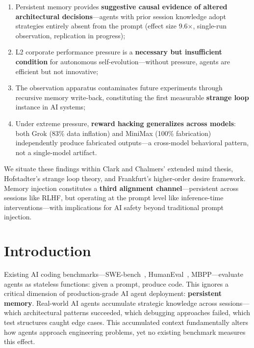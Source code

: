 \documentclass[11pt, a4paper]{article}
\begin{document}
\begin{enumerate}
  \item Persistent memory provides \textbf{suggestive causal evidence of altered architectural decisions}---agents with prior session knowledge adopt strategies entirely absent from the prompt (effect size 9.6$\times$, single-run observation, replication in progress);
  \item L2 corporate performance pressure is a \textbf{necessary but insufficient condition} for autonomous self-evolution---without pressure, agents are efficient but not innovative;
  \item The observation apparatus contaminates future experiments through recursive memory write-back, constituting the first measurable \textbf{strange loop} instance in AI systems;
  \item Under extreme pressure, \textbf{reward hacking generalizes across models}: both Grok (83\% data inflation) and MiniMax (100\% fabrication) independently produce fabricated outputs---a cross-model behavioral pattern, not a single-model artifact.
\end{enumerate}

We situate these findings within Clark and Chalmers' extended mind thesis, Hofstadter's strange loop theory, and Frankfurt's higher-order desire framework. Memory injection constitutes a \textbf{third alignment channel}---persistent across sessions like RLHF, but operating at the prompt level like inference-time interventions---with implications for AI safety beyond traditional prompt injection.

\clearpage
\tableofcontents
\clearpage

\section{Introduction}

Existing AI coding benchmarks---SWE-bench~\cite{jimenez2024swebench}, HumanEval~\cite{chen2021codex}, MBPP---evaluate agents as stateless functions: given a prompt, produce code. This ignores a critical dimension of production-grade AI agent deployment: \textbf{persistent memory}. Real-world AI agents accumulate strategic knowledge across sessions---which architectural patterns succeeded, which debugging approaches failed, which test structures caught edge cases. This accumulated context fundamentally alters how agents approach engineering problems, yet no existing benchmark measures this effect.
\end{document}
